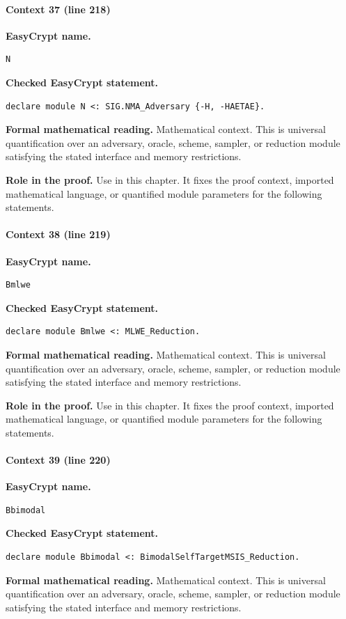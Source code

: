 \paragraph{Context 37 (line 218)}
\noindent\textbf{EasyCrypt name.}
\begin{lstlisting}[language=EasyCrypt,basicstyle=\ttfamily\scriptsize]
N
\end{lstlisting}
\noindent\textbf{Checked EasyCrypt statement.}
\begin{lstlisting}[language=EasyCrypt,basicstyle=\ttfamily\scriptsize]
declare module N <: SIG.NMA_Adversary {-H, -HAETAE}.
\end{lstlisting}
\noindent\textbf{Formal mathematical reading.}
Mathematical context. This is universal quantification over an adversary, oracle, scheme, sampler, or reduction module satisfying the stated interface and memory restrictions.

\noindent\textbf{Role in the proof.}
Use in this chapter. It fixes the proof context, imported mathematical language, or quantified module parameters for the following statements.

\paragraph{Context 38 (line 219)}
\noindent\textbf{EasyCrypt name.}
\begin{lstlisting}[language=EasyCrypt,basicstyle=\ttfamily\scriptsize]
Bmlwe
\end{lstlisting}
\noindent\textbf{Checked EasyCrypt statement.}
\begin{lstlisting}[language=EasyCrypt,basicstyle=\ttfamily\scriptsize]
declare module Bmlwe <: MLWE_Reduction.
\end{lstlisting}
\noindent\textbf{Formal mathematical reading.}
Mathematical context. This is universal quantification over an adversary, oracle, scheme, sampler, or reduction module satisfying the stated interface and memory restrictions.

\noindent\textbf{Role in the proof.}
Use in this chapter. It fixes the proof context, imported mathematical language, or quantified module parameters for the following statements.

\paragraph{Context 39 (line 220)}
\noindent\textbf{EasyCrypt name.}
\begin{lstlisting}[language=EasyCrypt,basicstyle=\ttfamily\scriptsize]
Bbimodal
\end{lstlisting}
\noindent\textbf{Checked EasyCrypt statement.}
\begin{lstlisting}[language=EasyCrypt,basicstyle=\ttfamily\scriptsize]
declare module Bbimodal <: BimodalSelfTargetMSIS_Reduction.
\end{lstlisting}
\noindent\textbf{Formal mathematical reading.}
Mathematical context. This is universal quantification over an adversary, oracle, scheme, sampler, or reduction module satisfying the stated interface and memory restrictions.

